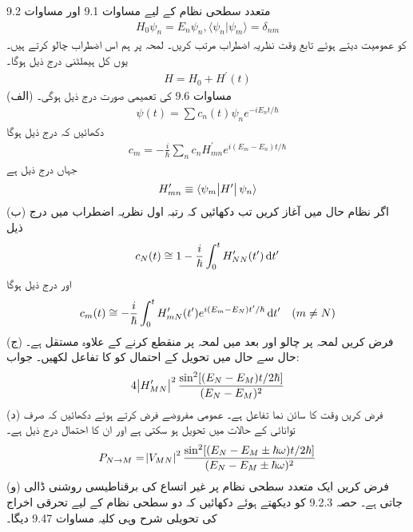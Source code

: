 متعدد سطحی نظام کے لیے مساوات \num{9.1} اور مساوات \num{9.2} 
\begin{align}
	H_0\psi_n = E_n\psi_n, \langle \psi_n|\psi_m \rangle = \delta_{nm}
\end{align}
کو عمومیت دیتے ہوئے تابع وقت نظریہ اضطراب  مرتب کریں۔ لمحہ  پر ہم اس اضطراب  چالو کرتے ہیں۔ یوں کل ہیملٹنی درج ذیل ہوگا۔
\begin{align}
	H = H_0 + H^\prime(t)
\end{align}
(الف) مساوات \num{9.6} کی تعمیمی صورت درج ذیل ہوگی۔
\begin{align}
	\psi(t) = \sum c_n(t)\psi_ne^{-iE_nt/\hbar}
\end{align}
دکھائیں کہ درج ذیل ہوگا
\begin{align}
	c_m = -\frac{i}{\hbar}\sum_{n} c_nH^\prime_{mn}e^{i(E_m-E_n)t/\hbar}
\end{align}
جہاں  درج ذیل ہے
\begin{align}
	H^\prime_{mn} \equiv \langle \psi_m\abs{H^\prime}\psi_n \rangle
\end{align}
(ب) اگر نظام حال  میں آغاز کریں تب دکھائیں کہ رتبہ اول نظریہ اضطراب میں درج ذیل
\begin{align}
	c_N(t)\cong1-\frac{i}{\hbar}\int_{0}^{t}H^\prime_{NN}(t^\prime)\dif t^\prime
\end{align}
اور درج ذیل ہوگا
\begin{align}
	c_m(t)\cong-\frac{i}{\hbar}\int_{0}^{t}H^\prime_{mN}(t^\prime)e^{i(E_m-E_N)t^\prime/\hbar}\dif t^\prime \quad(m\neq N)
\end{align}
(ج) فرض کریں لمحہ  پر چالو اور بعد میں لمحہ  پر منقطع کرنے کے علاوہ  مستقل ہے۔ حال  سے حال  میں تحویل کے احتمال کو  کا تفاعل لکھیں۔ جواب:
\begin{align}
	4\abs{H^\prime_{MN}}^2\frac{\sin^2[(E_N-E_M)t/2\hbar]}{(E_N-E_M)^2}
\end{align}
(د) فرض کریں  وقت کا سائن نما تفاعل  ہے۔ عمومی مفروضے فرض کرتے ہوئے دکھائیں کہ صرف توانائی  کے حالات میں تحویل ہو سکتی ہے اور ان کا احتمال درج ذیل ہے۔
\begin{align}
	P_{N\rightarrow M} = \abs{V_{MN}}^2\frac{\sin^2[(E_N-E_M\pm\hbar\omega)t/2\hbar]}{(E_N-E_M\pm\hbar\omega)^2}
\end{align}
(و) فرض کریں ایک متعدد سطحی نظام پر غیر اتساع کی برقناطیسی روشنی ڈالی جاتی ہے۔ حصہ 9.2.3 کو دیکھتے ہوئے دکھائیں کہ دو سطحی نظام کے لیے تحرقی اخراج کی تحویلی شرح وہی کلیہ مساوات \num{9.47} دیگا۔
